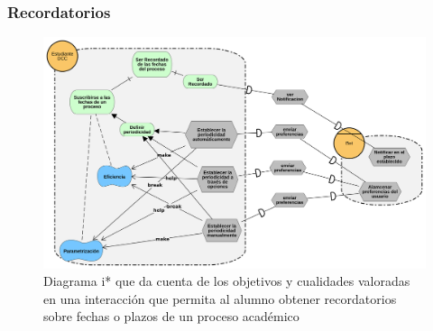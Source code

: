     \subsubsection{Recordatorios}
        \begin{figure}[ht]
            \centering
            \includegraphics[width=\textwidth]{media/diagramas/i_star/Recordatorios.png}
            \caption[Diagrama i* Recordatorios]{Diagrama i* que da cuenta de los objetivos y cualidades valoradas en una interacción que permita al alumno obtener recordatorios sobre fechas o plazos de un proceso académico}
            \label{}
        \end{figure}

